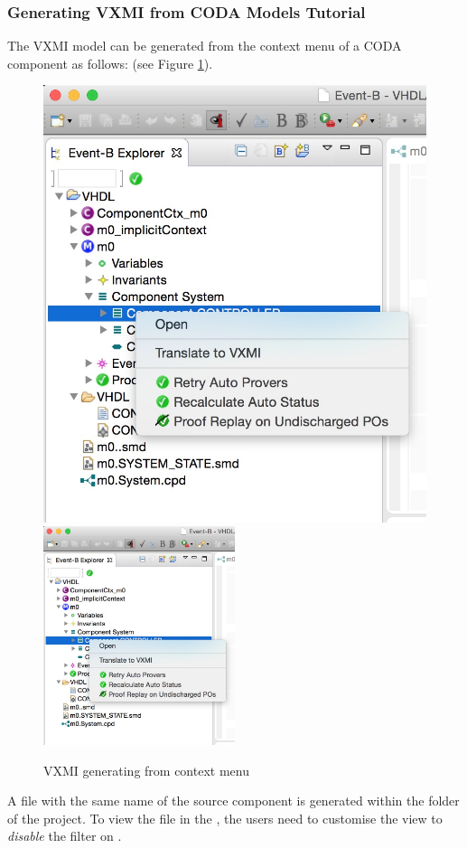 \subsubsection{Generating VXMI from CODA Models Tutorial}
\label{sec:coda-2-vxmi-tutorial}
The VXMI model can be generated from the context menu of a CODA component as follows:   (see Figure \ref{fig:vxmi-context_menu}).
\begin{figure}[!htbp]
  \centering
  \ifplastex
  \includegraphics[width=512]{figures/vxmi-context_menu}
  \else
  \includegraphics[width=0.5\textwidth]{figures/vxmi-context_menu}
  \fi
  \caption{VXMI generating from context menu}
  \label{fig:vxmi-context_menu}
\end{figure}
A  file with the same name of the source component is generated within the  folder of the project.  To view the file in the , the users need to customise the view to \emph{disable} the filter on .

